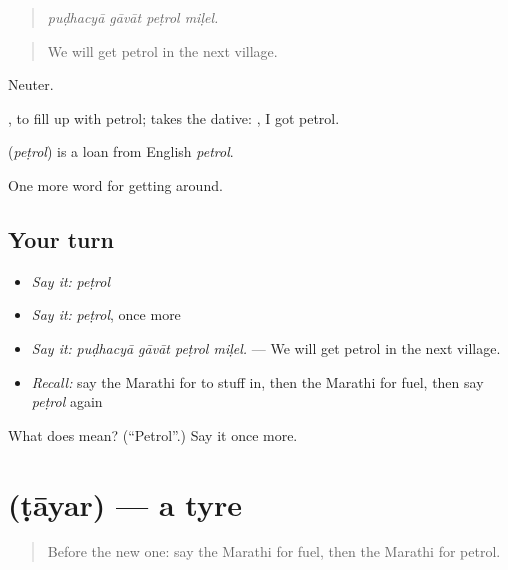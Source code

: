 \begin{quote}
\emph{puḍhacyā gāvāt peṭrol miḷel.}
\end{quote}

\begin{quote}
We will get petrol in the next village.
\end{quote}

Neuter.

 , to fill up with petrol;  takes the dative:   , I got petrol.

\begin{cousinweb}
\textbf{} (\emph{peṭrol}) is a loan from English \emph{petrol}.
\end{cousinweb}

\begin{grammarlens}[title={What you've built}]
One more word for getting around.
\end{grammarlens}

\subsection*{Your turn}
\begin{itemize}
\raggedright
  \item \emph{Say it:} \emph{peṭrol}
  \item \emph{Say it:} \emph{peṭrol}, once more
  \item \emph{Say it:} \emph{puḍhacyā gāvāt peṭrol miḷel.} — We will get petrol in the next village.
  \item \emph{Recall:} say the Marathi for to stuff in, then the Marathi for fuel, then say \emph{peṭrol} again
\end{itemize}

\begin{tcolorbox}[breakable,colback=teal!4,colframe=teal!35!black,title={Before you move on}]
What does  mean? (\textquotedblleft{}Petrol\textquotedblright{}.) Say it once more.
\end{tcolorbox}
\section[\texorpdfstring{\mr{टायर} (ṭāyar)}{टायर (ṭāyar)}]{ (ṭāyar) — a tyre}

\label{lesson:MR-C401-tayar}



\begin{quote}
Before the new one: say the Marathi for fuel, then the Marathi for petrol.
\end{quote}

